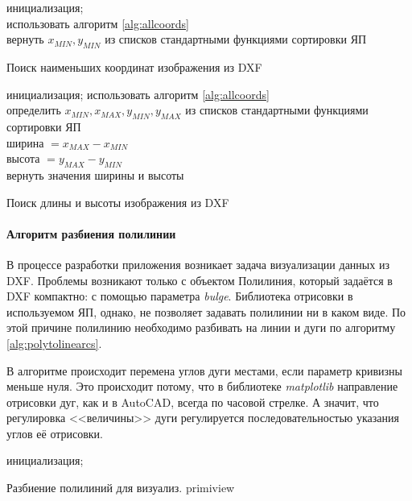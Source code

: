 \begin{algorithm}[H]
	\SetAlgoLined
	инициализация;\\
	использовать алгоритм \ref{alg:allcoords}\\
	вернуть $x_{MIN}, y_{MIN}$ из списков стандартными функциями сортировки ЯП
	\caption{Поиск наименьших координат изображения из DXF}
	\label{alg:extremums}
\end{algorithm}

\begin{algorithm}[H]
	\SetAlgoLined
	инициализация;
	использовать алгоритм \ref{alg:allcoords}\\
	определить $x_{MIN}, x_{MAX}, y_{MIN}, y_{MAX}$ из списков стандартными функциями сортировки ЯП\\
	ширина $=x_{MAX}-x_{MIN}$\\
	высота $=y_{MAX}-y_{MIN}$\\
	вернуть значения ширины и высоты
	\caption{Поиск длины и высоты изображения из DXF}
	\label{alg:dimes}
\end{algorithm}

\paragraph{Алгоритм разбиения полилинии}
В процессе разработки приложения возникает задача визуализации данных из DXF. Проблемы возникают только с объектом Полилиния, который задаётся в DXF компактно: с помощью параметра \textit{bulge}. Библиотека отрисовки в используемом ЯП, однако, не позволяет задавать полилинии ни в каком виде. По этой причине полилинию необходимо разбивать на линии и дуги по алгоритму \ref{alg:polytolinearcs}.

В алгоритме происходит перемена углов дуги местами, если параметр кривизны меньше нуля. Это происходит потому, что в библиотеке \textit{matplotlib} направление отрисовки дуг, как и в AutoCAD, всегда по часовой стрелке. А значит, что регулировка <<величины>> дуги регулируется последовательностью указания углов её отрисовки.

\begin{algorithm}[H]
	\SetAlgoLined
	инициализация;
	\caption{Разбиение полилиний для визуализ. primiview}
	\label{alg:polytolinearcs}
\end{algorithm}

